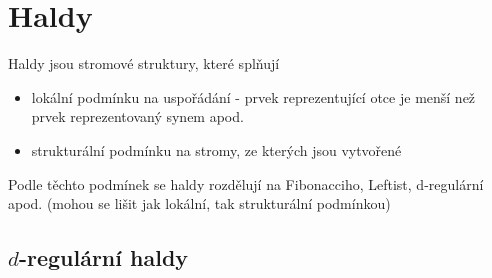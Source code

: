 
\chapter{Haldy}

\begin{defn}
Haldy jsou stromové struktury, které splňují 
\begin{itemize}
\item lokální podmínku na uspořádání
  - prvek reprezentující otce je menší než prvek reprezentovaný synem
    apod.
\item strukturální podmínku na stromy, ze kterých jsou vytvořené 
\end{itemize}
\end{defn}

\begin{pozn}
Podle těchto podmínek se haldy rozdělují na Fibonacciho, Leftist,
d-regulární apod. (mohou se lišit jak lokální, tak strukturální podmínkou)
\end{pozn}

\section{$d$-regulární haldy}

